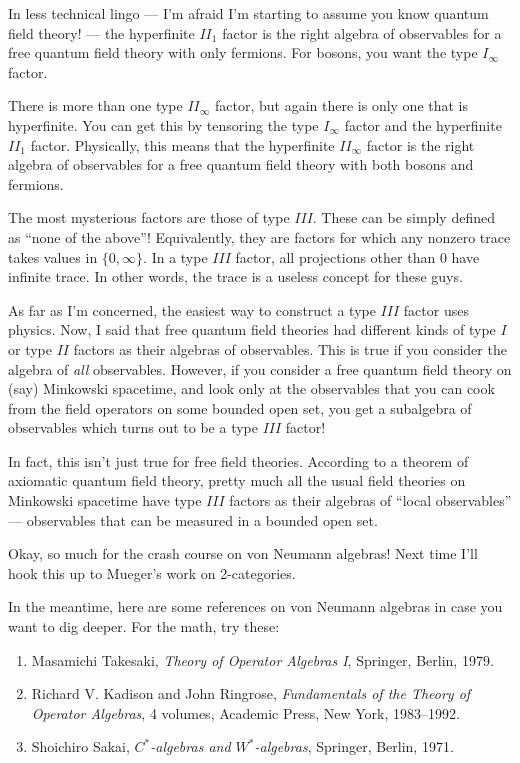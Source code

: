 \documentclass{article}
\begin{document}
In less technical lingo --- I'm afraid I'm starting to assume you know
quantum field theory! --- the hyperfinite \(II_1\) factor is the right
algebra of observables for a free quantum field theory with only
fermions. For bosons, you want the type \(I_\infty\) factor.

There is more than one type $II_\infty$ factor, but again there is only
one that is hyperfinite. You can get this by tensoring the type
\(I_\infty\) factor and the hyperfinite \(II_1\) factor. Physically,
this means that the hyperfinite \(II_\infty\) factor is the right
algebra of observables for a free quantum field theory with both bosons
and fermions.

The most mysterious factors are those of type \(III\). These can be
simply defined as ``none of the above''! Equivalently, they are factors
for which any nonzero trace takes values in \(\{0,\infty\}\). In a type
\(III\) factor, all projections other than \(0\) have infinite trace. In
other words, the trace is a useless concept for these guys.

As far as I'm concerned, the easiest way to construct a type \(III\)
factor uses physics. Now, I said that free quantum field theories had
different kinds of type \(I\) or type \(II\) factors as their algebras
of observables. This is true if you consider the algebra of \emph{all}
observables. However, if you consider a free quantum field theory on
(say) Minkowski spacetime, and look only at the observables that you can
cook from the field operators on some bounded open set, you get a
subalgebra of observables which turns out to be a type \(III\) factor!

In fact, this isn't just true for free field theories. According to a
theorem of axiomatic quantum field theory, pretty much all the usual
field theories on Minkowski spacetime have type \(III\) factors as their
algebras of ``local observables'' --- observables that can be measured
in a bounded open set.

Okay, so much for the crash course on von Neumann algebras! Next time
I'll hook this up to Mueger's work on 2-categories.

In the meantime, here are some references on von Neumann algebras in
case you want to dig deeper. For the math, try these:

\begin{enumerate}
\def\labelenumi{\arabic{enumi})}
\setcounter{enumi}{4}
\item
  Masamichi Takesaki, \emph{Theory of Operator Algebras I}, Springer,
  Berlin, 1979.
\item
  Richard V. Kadison and John Ringrose, \emph{Fundamentals of the Theory
  of Operator Algebras}, 4 volumes, Academic Press, New York,
  1983--1992.
\item
  Shoichiro Sakai, \emph{\(C^*\)-algebras and \(W^*\)-algebras},
  Springer, Berlin, 1971.
\end{enumerate}
\end{document}
